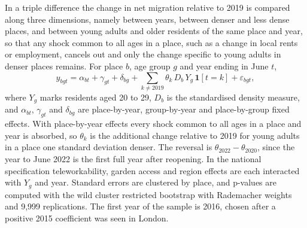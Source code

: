 \documentclass[11pt,a4paper]{article}
\begin{document}
In a triple difference the change in net migration relative to 2019 is compared along three dimensions, namely between years, between denser and less dense places, and between young adults and older residents of the same place and year, so that any shock common to all ages in a place, such as a change in local rents or employment, cancels out and only the change specific to young adults in denser places remains. For place $b$, age group $g$ and year ending in June $t$,
\begin{equation}\label{eq:ddd}
y_{bgt} = \alpha_{bt} + \gamma_{gt} + \delta_{bg} + \sum_{k \neq 2019} \theta_k \, D_b \, Y_g \, \mathbf{1}[t = k] + \varepsilon_{bgt},
\end{equation}
where $Y_g$ marks residents aged 20 to 29, $D_b$ is the standardised density measure, and $\alpha_{bt}$, $\gamma_{gt}$ and $\delta_{bg}$ are place-by-year, group-by-year and place-by-group fixed effects. With place-by-year effects every shock common to all ages in a place and year is absorbed, so $\theta_k$ is the additional change relative to 2019 for young adults in a place one standard deviation denser. The reversal is $\theta_{2022} - \theta_{2020}$, since the year to June 2022 is the first full year after reopening. In the national specification teleworkability, garden access and region effects are each interacted with $Y_g$ and year. Standard errors are clustered by place, and p-values are computed with the wild cluster restricted bootstrap with Rademacher weights and 9,999 replications. The first year of the sample is 2016, chosen after a positive 2015 coefficient was seen in London.
\end{document}
